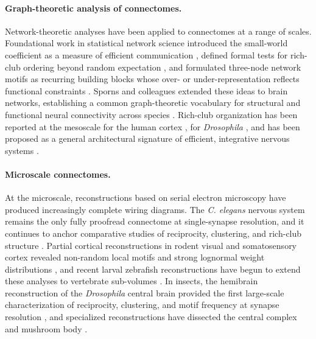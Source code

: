 \paragraph{Graph-theoretic analysis of connectomes.}
Network-theoretic analyses have been applied to connectomes at a range of scales. Foundational work in statistical network science introduced the small-world coefficient as a measure of efficient communication \cite{watts1998collective}, defined formal tests for rich-club ordering beyond random expectation \cite{colizza2006detecting}, and formulated three-node network motifs as recurring building blocks whose over- or under-representation reflects functional constraints \cite{milo2002network}. Sporns and colleagues extended these ideas to brain networks, establishing a common graph-theoretic vocabulary for structural and functional neural connectivity across species \cite{sporns2004organization,bullmore2009complex}. Rich-club organization has been reported at the mesoscale for the human cortex \cite{vandenheuvel2011rich}, for \textit{Drosophila} \cite{shih2015connectomics}, and has been proposed as a general architectural signature of efficient, integrative nervous systems \cite{fornito2015connectomics}.

\paragraph{Microscale connectomes.}
At the microscale, reconstructions based on serial electron microscopy have produced increasingly complete wiring diagrams. The \textit{C. elegans} nervous system remains the only fully proofread connectome at single-synapse resolution, and it continues to anchor comparative studies of reciprocity, clustering, and rich-club structure \cite{white1986structure,varshney2011structural,cook2019whole,towlson2013rich}. Partial cortical reconstructions in rodent visual and somatosensory cortex revealed non-random local motifs and strong lognormal weight distributions \cite{song2005highly,motta2019dense,loomba2022connectomic}, and recent larval zebrafish reconstructions have begun to extend these analyses to vertebrate sub-volumes \cite{svara2022automated}. In insects, the hemibrain reconstruction of the \textit{Drosophila} central brain provided the first large-scale characterization of reciprocity, clustering, and motif frequency at synapse resolution \cite{scheffer2020connectome}, and specialized reconstructions have dissected the central complex \cite{hulse2021connectome} and mushroom body \cite{takemura2017complete,amin2020inhibitory}.

